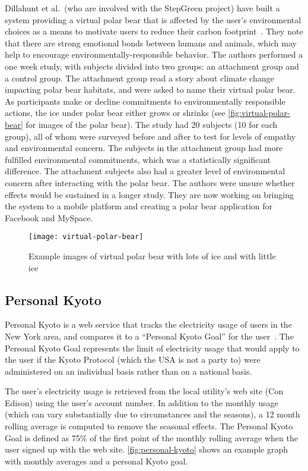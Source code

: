 Dillahunt et al.\ (who are involved with the StepGreen project) have built a system providing a virtual polar bear that is affected by the user's environmental choices as a means to motivate users to reduce their carbon footprint~\cite{dillahunt-virtual-polar-bear-2008}. They note that there are strong emotional bonds between humans and animals, which may help to encourage environmentally-responsible behavior. The authors performed a one week study, with subjects divided into two groups: an attachment group and a control group. The attachment group read a story about climate change impacting polar bear habitats, and were asked to name their virtual polar bear. As participants make or decline commitments to environmentally responsible actions, the ice under polar bear either grows or shrinks (see \autoref{fig:virtual-polar-bear} for images of the polar bear). The study had 20 subjects (10 for each group), all of whom were surveyed before and after to test for levels of empathy and environmental concern. The subjects in the attachment group had more fulfilled environmental commitments, which was a statistically significant difference. The attachment subjects also had a greater level of environmental concern after interacting with the polar bear. The authors were unsure whether effects would be sustained in a longer study. They are now working on bringing the system to a mobile platform and creating a polar bear application for Facebook and MySpace.

\begin{figure}[htbp]
	\centering
		\texttt{[image: virtual-polar-bear]}
		\caption{Example images of virtual polar bear with lots of ice and with little ice}
		\label{fig:virtual-polar-bear}
\end{figure}


\subsection{Personal Kyoto}
\label{sec:personal-kyoto}

Personal Kyoto is a web service that tracks the electricity usage of users in the New York area, and compares it to a ``Personal Kyoto Goal'' for the user~\cite{Personal-Kyoto-website}. The Personal Kyoto Goal represents the limit of electricity usage that would apply to the user if the Kyoto Protocol (which the USA is not a party to) were administered on an individual basis rather than on a national basis.

The user's electricity usage is retrieved from the local utility's web site (Con Edison) using the user's account number. In addition to the monthly usage (which can vary substantially due to circumstances and the seasons), a 12 month rolling average is computed to remove the seasonal effects. The Personal Kyoto Goal is defined as 75\% of the first point of the monthly rolling average when the user signed up with the web site. \autoref{fig:personal-kyoto} shows an example graph with monthly averages and a personal Kyoto goal.

